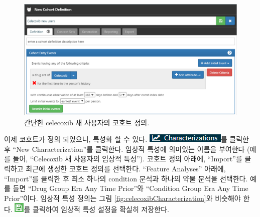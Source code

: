 \documentclass[11pt]{book}
\theoremstyle{definition}
\theoremstyle{definition}
\theoremstyle{definition}
\theoremstyle{remark}
\begin{document}
\begin{figure}

{\centering \includegraphics[width=1\linewidth]{images/SuggestedAnswers/celecoxibCohortDefinition} 

}

\caption{간단한 celecoxib 새 사용자의 코호트 정의.}\label{fig:celecoxibCohortDefinition}
\end{figure}

이제 코호트가 정의 되었으니, 특성화 할 수 있다.
\includegraphics{images/Characterization/atlasCharacterizationMenuItem.png}를
클릭한 후 ``New Characterization''를 클릭한다. 임상적 특성에 의미있는
이름을 부여한다 (예를 들어, ``Celecoxib 새 사용자의 임상적 특성'').
코호트 정의 아래에, ``Import''를 클릭하고 최근에 생성한 코호트 정의를
선택한다. ``Feature Analyses'' 아래에, ``Import''를 클릭한 후 최소
하나의 condition 분석과 하나의 약물 분석을 선택한다. 예를 들면 ``Drug
Group Era Any Time Prior''와 ``Condition Group Era Any Time Prior''이다.
임상적 특성 정의는 그림 \ref{fig:celecoxibCharacterization}와 비슷해야
한다. \includegraphics{images/Cohorts/save.png}를 클릭하여 임상적 특성
설정을 확실히 저장한다.
\end{document}
